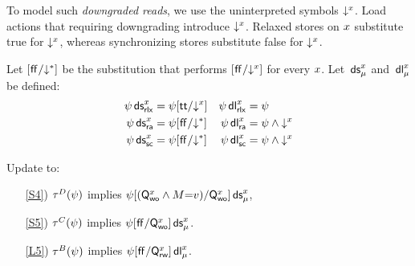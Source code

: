 To model such \emph{downgraded reads}, we use the uninterpreted symbols
$\mathord{\downarrow^{x}}$.  Load actions that requiring downgrading introduce $\mathord{\downarrow^{x}}$.
Relaxed stores on $x$ substitute true for $\mathord{\downarrow^{x}}$, whereas
synchronizing stores substitute false for $\mathord{\downarrow^{x}}$.

\begin{definition}
  \label{def:DS}
  Let $[\mkern.6mu\mathsf{ff}\mkern.6mu/\mathord{\downarrow^{\mathtt{*}}}]$ be the substitution that performs $[\mkern.6mu\mathsf{ff}\mkern.6mu/\mathord{\downarrow^{x}}]$
  for every $x$.
  Let $\,\mathsf{ds}_{\mu}^{x}$ and $\,\mathsf{dl}_{\mu}^{x}$ be defined:
  \begin{align*}
    \DS{\aLoc}{\mRLX}{\bForm}&=\bForm[\TRUE/\Dx{\aLoc}] 
    &\DL{\aLoc}{\mRLX}{\bForm}&=\bForm%
    \\
    \DS{\aLoc}{\mRA}{\bForm}&=\bForm[\FALSE/\D]
    &\DL{\aLoc}{\mRA}{\bForm}&=\bForm\land\Dx{\aLoc}
    \\
    \DS{\aLoc}{\mSC}{\bForm}&=\bForm[\FALSE/\D]
    &\DL{\aLoc}{\mSC}{\bForm}&=\bForm\land\Dx{\aLoc}
  \end{align*}
\end{definition}

\begin{definition}[$\xCO$/$\xRASC$/$\xDGR$]
  \label{def:pomsets-down}
  Update  to:
  \begin{enumerate}
  \item[\ref{S4})]
    $\aTr{\bEvs}{\bForm}$ implies $\psi[(\mathsf{Q}_{\mathsf{wo}}^{x}\land M{=}v)/\mathsf{Q}_{\mathsf{wo}}^{x}]\,\mathsf{ds}_{\mu}^{x}$,
  \item[\ref{S5})]
    $\aTr{\cEvs}{\bForm}$ implies $\psi[\mkern.6mu\mathsf{ff}\mkern.6mu/\mathsf{Q}_{\mathsf{wo}}^{x}]\,\mathsf{ds}_{\mu}^{x}$.
  \item[\ref{L5})]
    $\aTr{\dEvs}{\bForm}$ implies $\psi[\mkern.6mu\mathsf{ff}\mkern.6mu/\mathsf{Q}_{\mathsf{rw}}^{x}]\,\mathsf{dl}_{\mu}^{x}$.
  \end{enumerate}
\end{definition}

